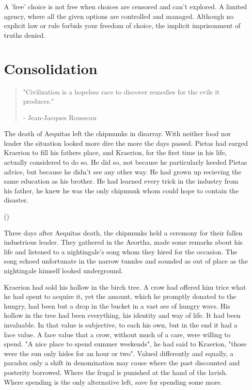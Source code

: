 \documentclass[smalldemyvopaper,11pt,twoside,onecolumn,openright,extrafontsizes]{memoir}
\newlength\drop
\begin{document}
A 'free' choice is not free when choices are censored and can't explored. A limited agency, where all the given options are controlled and managed. Although no explicit law or rule forbids your freedom of choice, the implicit imprisonment of truths denied. 

\chapter{Consolidation}

\vspace{-1.3cm}
\begin{localsize}{10}
	\begin{quote}
		"Civilization is a hopeless race to discover remedies for the evils it produces."
		\begin{flushright}- Jean-Jacques Rousseau\end{flushright}
	\end{quote} 
\end{localsize}
\vspace{1cm}

The death of Aequitas left the chipmunks in disarray. With neither food nor leader the situation looked more dire the more the days passed. Pietas had earged Kraerion to fill his fathers place, and Kraerion, for the first time in his life, actually considered to do so. He did so, not because he particularly heeded Pietas advice, but because he didn't see any other way. He had grown up recieving the same education as his brother. He had learned every trick in the industry from his father, he knew he was the only chipmunk whom could hope to contain the disaster.

()

Three days after Aequitas death, the chipmunks held a ceremony for their fallen industrious leader. They gathered in the Aeortha, made some remarks about his life and listened to a nightingale's song whom they hired for the occasion. The song echoed unfortunate in the narrow tunnles and sounded as out of place as the nightingale himself looked underground. 

 
Kraerion had sold his hollow in the birch tree. A crow had offered him trice what he had spent to acquire it, yet the amount, which he promptly donated to the hungry, had been but a drop in the bucket in a vast see of hungry wavs. 
His hollow in the tree had been everything, his identity and way of life. It had been invaluable. In that value is subjective, to each his own, but in the end it had a face value. A face value that a crow, without much of a care, were willing to spend. "A nice place to spend summer weekends", he had said to Kraerion, "those were the sun only hides for an hour or two". Valued differently and equally, a paradox only a shift in denomination may cause where the past discounted and posterity borrowed. Where the frugal is punished at the hand of the lavish. Where spending is the only alternative left, save for spending some more.
\end{document}
